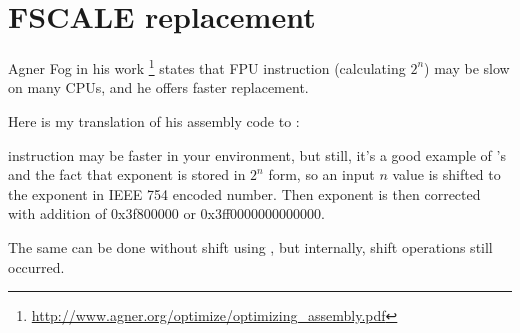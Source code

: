 \section{FSCALE replacement}

Agner Fog in his  work
\footnote{\url{http://www.agner.org/optimize/optimizing_assembly.pdf}} states that  \ac{FPU} instruction
(calculating $2^n$) may be slow on many CPUs, and he offers faster replacement.

Here is my translation of his assembly code to \CCpp:



 instruction may be faster in your environment, but still, it's a good example of 's and the fact
that exponent is stored in $2^n$ form,
so an input $n$ value is shifted to the exponent in IEEE 754 encoded number.
Then exponent is then corrected with addition of 0x3f800000 or 0x3ff0000000000000.

The same can be done without shift using , but internally, shift operations still occurred.


